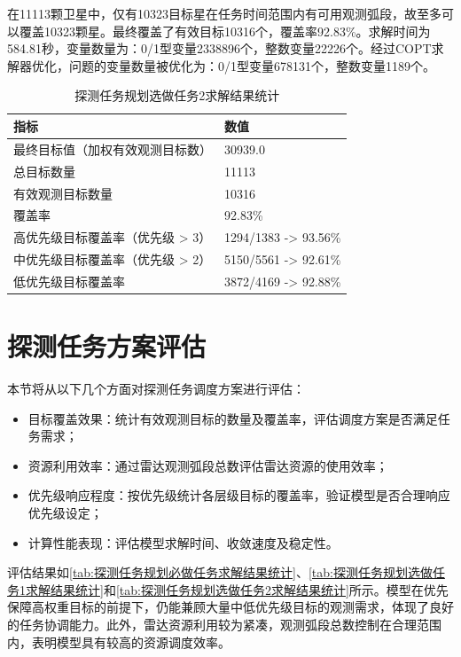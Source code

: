 \documentclass[openany,12pt,UTF8]{ctexart}
\begin{document}
在11113颗卫星中，仅有10323目标星在任务时间范围内有可用观测弧段，故至多可以覆盖10323颗星。最终覆盖了有效目标10316个，覆盖率92.83\%。求解时间为584.81秒，变量数量为：0/1型变量2338896个，整数变量22226个。经过COPT求解器优化，问题的变量数量被优化为：0/1型变量678131个，整数变量1189个。
\begin{table}[h]
    \centering
    \caption{探测任务规划选做任务2求解结果统计}
    \label{tab:探测任务规划选做任务2求解结果统计}
    \begin{tabularx}{0.8\columnwidth}{Xl}
        \toprule
        \textbf{指标}        & \textbf{数值}      \\
        \midrule
        最终目标值（加权有效观测目标数）   & 30939.0           \\
        总目标数量              & 11113              \\
        有效观测目标数量           & 10316              \\
        覆盖率                & 92.83\%          \\
        高优先级目标覆盖率（优先级 > 3） & 1294/1383 -> 93.56\%  \\
        中优先级目标覆盖率（优先级 > 2） & 5150/5561 -> 92.61\%  \\
        低优先级目标覆盖率          & 3872/4169 -> 92.88\% \\
        \bottomrule
    \end{tabularx}
\end{table}

\section{探测任务方案评估}
本节将从以下几个方面对探测任务调度方案进行评估：
\begin{itemize}
    \item {目标覆盖效果}：统计有效观测目标的数量及覆盖率，评估调度方案是否满足任务需求；
    \item {资源利用效率}：通过雷达观测弧段总数评估雷达资源的使用效率；
    \item {优先级响应程度}：按优先级统计各层级目标的覆盖率，验证模型是否合理响应优先级设定；
    \item {计算性能表现}：评估模型求解时间、收敛速度及稳定性。
\end{itemize}

评估结果如\autoref{tab:探测任务规划必做任务求解结果统计}、\autoref{tab:探测任务规划选做任务1求解结果统计}和\autoref{tab:探测任务规划选做任务2求解结果统计}所示。模型在优先保障高权重目标的前提下，仍能兼顾大量中低优先级目标的观测需求，体现了良好的任务协调能力。此外，雷达资源利用较为紧凑，观测弧段总数控制在合理范围内，表明模型具有较高的资源调度效率。
\end{document}
